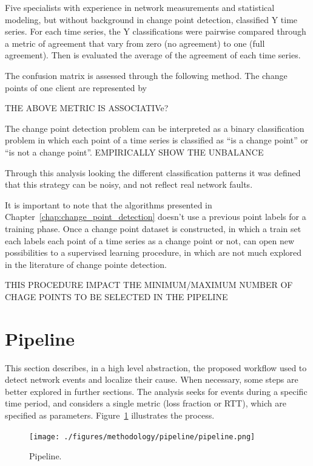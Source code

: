 Five specialists with experience in network measurements and statistical
modeling, but without background in change point detection, classified Y time
series.
For each time series, the Y classifications were pairwise compared through a
metric of agreement that vary from zero (no agreement) to one (full
agreement). Then is evaluated the average of the agreement of each time series.

The confusion matrix is assessed through the following method. The change
points of one client are represented by

THE ABOVE METRIC IS ASSOCIATIVe?

The change point detection problem can be interpreted as a binary
classification problem in which each point of a time series is classified as
``is a change point'' or ``is not a change point''.
EMPIRICALLY SHOW THE UNBALANCE

Through this analysis looking the different classification patterns it was
defined that this strategy can be noisy, and not reflect real network faults.

It is important to note that the algorithms presented in
Chapter~\ref{chap:change_point_detection} doesn't use a previous point labels
for a training phase. Once a change point dataset is constructed, in which a
train set each labels each point of a time series as a change point or not, can
open new possibilities to a supervised learning procedure, in which are not
much explored in the literature of change pointe detection.

THIS PROCEDURE IMPACT THE MINIMUM/MAXIMUM NUMBER OF CHAGE POINTS TO BE SELECTED
IN THE PIPELINE

\section{Pipeline}

This section describes, in a high level abstraction, the proposed workflow
used to detect network events and localize their cause. When necessary, some
steps are better explored in further sections.
The analysis seeks for events during a specific time period, and considers a
single metric (loss fraction or RTT), which are specified as parameters.
Figure~\ref{fig:pipeline} illustrates the process.

\begin{figure}[H]
    \centering
    \texttt{[image: ./figures/methodology/pipeline/pipeline.png]}
    \caption{Pipeline.}
\label{fig:pipeline}
\end{figure}%

